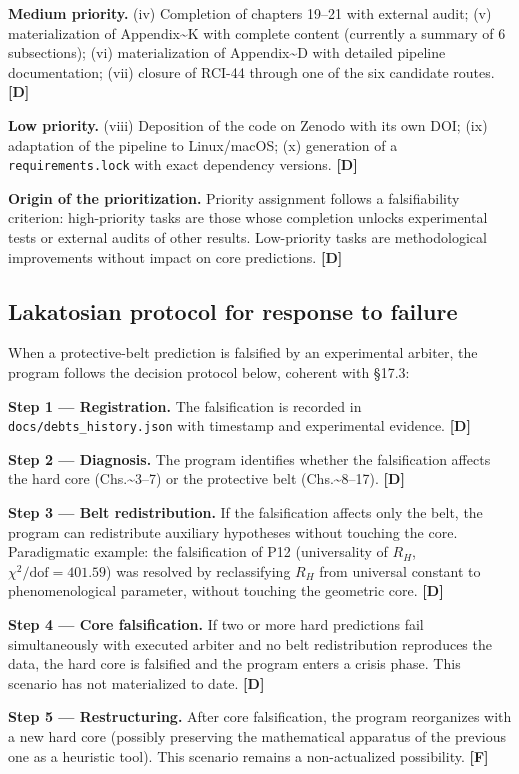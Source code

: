 ﻿\documentclass[11pt,letterpaper]{article}
\begin{document}
\textbf{Medium priority.} (iv) Completion of chapters 19--21 with external audit; (v) materialization of Appendix\textasciitilde{}K with complete content (currently a summary of 6 subsections); (vi) materialization of Appendix\textasciitilde{}D with detailed pipeline documentation; (vii) closure of RCI-44 through one of the six candidate routes. \textbf{[D]}

\textbf{Low priority.} (viii) Deposition of the code on Zenodo with its own DOI; (ix) adaptation of the pipeline to Linux/macOS; (x) generation of a \texttt{requirements.lock} with exact dependency versions. \textbf{[D]}

\textbf{Origin of the prioritization.} Priority assignment follows a falsifiability criterion: high-priority tasks are those whose completion unlocks experimental tests or external audits of other results. Low-priority tasks are methodological improvements without impact on core predictions. \textbf{[D]}
\subsection{Lakatosian protocol for response to failure}
When a protective-belt prediction is falsified by an experimental arbiter, the program follows the decision protocol below, coherent with §17.3:

\textbf{Step 1 --- Registration.} The falsification is recorded in \texttt{docs/debts\_history.json} with timestamp and experimental evidence. \textbf{[D]}

\textbf{Step 2 --- Diagnosis.} The program identifies whether the falsification affects the hard core (Chs.\textasciitilde{}3--7) or the protective belt (Chs.\textasciitilde{}8--17). \textbf{[D]}

\textbf{Step 3 --- Belt redistribution.} If the falsification affects only the belt, the program can redistribute auxiliary hypotheses without touching the core. Paradigmatic example: the falsification of P12 (universality of $R_H$, $\chi^2/\text{dof} = 401{.}59$) was resolved by reclassifying $R_H$ from universal constant to phenomenological parameter, without touching the geometric core. \textbf{[D]}

\textbf{Step 4 --- Core falsification.} If two or more hard predictions fail simultaneously with executed arbiter and no belt redistribution reproduces the data, the hard core is falsified and the program enters a crisis phase. This scenario has not materialized to date. \textbf{[D]}

\textbf{Step 5 --- Restructuring.} After core falsification, the program reorganizes with a new hard core (possibly preserving the mathematical apparatus of the previous one as a heuristic tool). This scenario remains a non-actualized possibility. \textbf{[F]}
\end{document}
